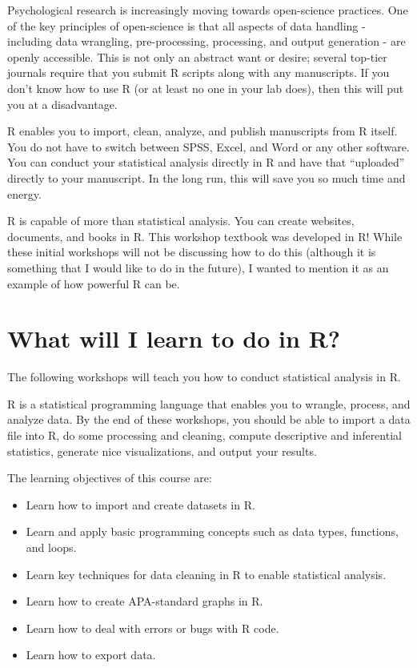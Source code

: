 \documentclass[
]{book}
\providecommand{\tightlist}{%
  \setlength{\itemsep}{0pt}\setlength{\parskip}{0pt}}
\begin{document}
Psychological research is increasingly moving towards open-science practices. One of the key principles of open-science is that all aspects of data handling - including data wrangling, pre-processing, processing, and output generation - are openly accessible. This is not only an abstract want or desire; several top-tier journals require that you submit R scripts along with any manuscripts. If you don't know how to use R (or at least no one in your lab does), then this will put you at a disadvantage.

R enables you to import, clean, analyze, and publish manuscripts from R itself. You do not have to switch between SPSS, Excel, and Word or any other software. You can conduct your statistical analysis directly in R and have that ``uploaded'' directly to your manuscript. In the long run, this will save you so much time and energy.

R is capable of more than statistical analysis. You can create websites, documents, and books in R. This workshop textbook was developed in R! While these initial workshops will not be discussing how to do this (although it is something that I would like to do in the future), I wanted to mention it as an example of how powerful R can be.

\hypertarget{what-will-i-learn-to-do-in-r}{%
\section{What will I learn to do in R?}\label{what-will-i-learn-to-do-in-r}}

The following workshops will teach you how to conduct statistical analysis in R.

R is a statistical programming language that enables you to wrangle, process, and analyze data. By the end of these workshops, you should be able to import a data file into R, do some processing and cleaning, compute descriptive and inferential statistics, generate nice visualizations, and output your results.

The learning objectives of this course are:

\begin{itemize}
\tightlist
\item
  Learn how to import and create datasets in R.
\item
  Learn and apply basic programming concepts such as data types, functions, and loops.
\item
  Learn key techniques for data cleaning in R to enable statistical analysis.
\item
  Learn how to create APA-standard graphs in R.
\item
  Learn how to deal with errors or bugs with R code.
\item
  Learn how to export data.
\end{itemize}
\end{document}
